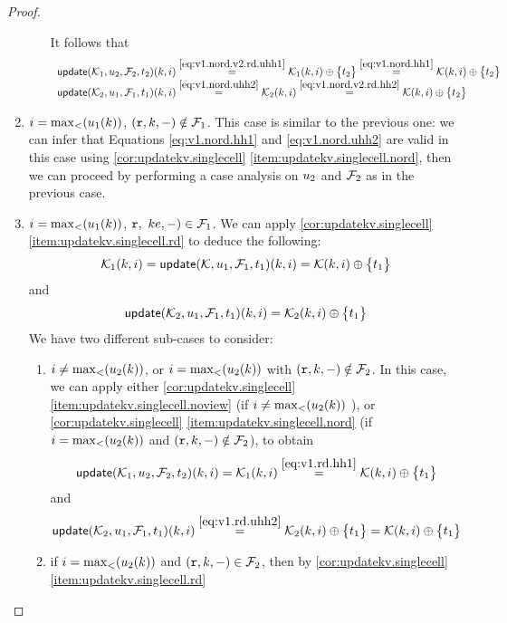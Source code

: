 \begin{proof}
\begin{enumerate}
\begin{enumerate}
It follows that 
\[
\begin{array}{l}
\updateKV(\hh_1, \vi_2, \fp_2, \txid_2)(\key, i) \stackrel{\cref{eq:v1.nord.v2.rd.uhh1}}{=} \hh_1(\key, i) \oplus \Set{\txid_2} \stackrel{\cref{eq:v1.nord.hh1}}{=} \mkvs(\key, i) \oplus \Set{\txid_2}\\
\updateKV(\hh_2,\vi_1,\fp_1, \txid_1)(\key, i) \stackrel{\cref{eq:v1.nord.uhh2}}{=} \hh_2(\key, i) \stackrel{\cref{eq:v1.nord.v2.rd.hh2}}{=} \mkvs(\key, i) \oplus \Set{\txid_2}
\end{array}
\]
\end{enumerate}
\item $i = \max_{<}(u_1(k))$, $(\textnormal{\texttt r}, k, -) \notin \mathcal{F}_1$. This case is similar to the previous one: we can infer 
that Equations \cref{eq:v1.nord.hh1} and \cref{eq:v1.nord.uhh2} are valid in this case using \cref{cor:updatekv.singlecell}
\cref{item:updatekv.singlecell.nord}, then we can proceed by performing a case analysis on $u_2$ and $\mathcal{F}_2$ as in the previous case.
\item $i = \max_{<}(u_1(k))$, $\textnormal{\texttt r},\ ke, -) \in \mathcal{F}_1$. We can apply \cref{cor:updatekv.singlecell}\cref{item:updatekv.singlecell.rd} 
to deduce the following: 
\begin{equation}
\hh_1(\key, i) = \updateKV(\mkvs, \vi_1, \fp_1, \txid_1)(\key, i) = \mkvs(\key, i) \oplus \Set{\txid_1}
\label{eq:v1.rd.hh1}
\end{equation}
and
\begin{equation}
\updateKV(\hh_2, \vi_1, \fp_1, \txid_1)(\key, i) = \hh_2(\key, i) \oplus \Set{\txid_1}
\label{eq:v1.rd.uhh2}
\end{equation}
We have two different sub-cases to consider: 
\begin{enumerate}
\item $i \neq \max_{<}(u_2(k))$, or $i = \max_{<}(u_2(k))$ with $(\textnormal{\texttt r},k,-) \notin \mathcal{F}_2$. In this case, we can apply either 
\cref{cor:updatekv.singlecell}\cref{item:updatekv.singlecell.noview} (if $i \neq \max_{<}(u_2(k))$ ), or 
\cref{cor:updatekv.singlecell} \cref{item:updatekv.singlecell.nord} (if $i = \max_{<}(u_2(k))$ and $(\textnormal{\texttt r}, k, -) \notin \mathcal{F}_2$), 
to obtain 
\[
\updateKV(\hh_1, \vi_2, \fp_2, \txid_2)(\key, i) = \hh_1(\key, i) \stackrel{\cref{eq:v1.rd.hh1}}{=} \mkvs(\key, i) \oplus \Set{\txid_1}
\]
and
\[
\updateKV(\hh_2, \vi_1, \fp_1, \txid_1)(\key, i) \stackrel{\cref{eq:v1.rd.uhh2}}{=} \hh_2(\key, i) \oplus \Set{ \txid_1 } = 
\mkvs(\key, i) \oplus \Set{ \txid_1 }
\]
\item if $i = \max_{<}(u_2(k))$ and $(\textnormal{\texttt r}, k, -) \in \mathcal{F}_2$, then by \cref{cor:updatekv.singlecell}\cref{item:updatekv.singlecell.rd} 

\end{enumerate}
\end{enumerate}
\end{proof}
